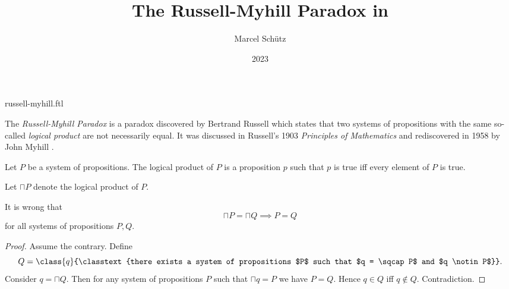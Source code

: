 \documentclass{stex}
\begin{document}
\title{The Russell-Myhill Paradox in \Naproche}
\author{Marcel Schütz}
\date{2023}
\maketitle
\begin{smodule}{russell-myhill.ftl}

  \noindent The \emph{Russell-Myhill Paradox} is a paradox discovered by Bertrand Russell which states that two systems of propositions with the same so-called \emph{logical product} are not necessarily equal.
  It was discussed in Russell's 1903 \emph{Principles of Mathematics} \cite[Appendix B]{Russell1903} and rediscovered in 1958 by John Myhill \cite{Myhill1958}.

\begin{forthel}
    \begin{signature*}
      Let $P$ be a system of propositions.
      The logical product of $P$ is a proposition $p$ such that $p$ is true iff every element of $P$ is true.
    \end{signature*}

    Let $\sqcap P$ denote the logical product of $P$.

    \begin{theorem*}\label{russell_myhill_paradox}
      It is wrong that
      \[ \sqcap P = \sqcap Q \implies P = Q \]
      for all systems of propositions $P, Q$.
    \end{theorem*}
    \begin{proof}
      Assume the contrary.
      Define \[Q = \class{q}{\classtext{there exists a system of propositions $P$ such that $q = \sqcap P$ and $q \notin P$}}.\]
      Consider $q = \sqcap Q$.
      Then for any system of propositions $P$ such that $\sqcap q = P$ we have $P = Q$.
      Hence $q \in Q$ iff $q \notin Q$.
      Contradiction.
    \end{proof}
  \end{forthel}
\end{smodule}
\printbibliography
\end{document}
